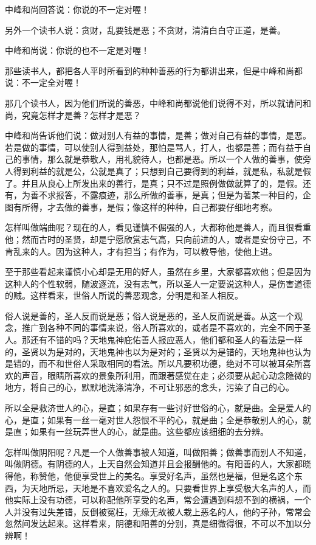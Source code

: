 \documentclass[12pt,twoside,openany]{book}
\begin{document}
中峰和尚回答说：你说的不一定对喔！

另外一个读书人说：贪财，乱要钱是恶；不贪财，清清白白守正道，是善。

中峰和尚说：你说的也不一定是对喔！

那些读书人，都把各人平时所看到的种种善恶的行为都讲出来，但是中峰和尚都说：不一定全对喔！

那几个读书人，因为他们所说的善恶，中峰和尚都说他们说得不对，所以就请问和尚，究竟怎样才是善？怎样才是恶？

中峰和尚告诉他们说：做对别人有益的事情，是善；做对自己有益的事情，是恶。若是做的事情，可以使别人得到益处，那怕是骂人，打人，也都是善；而有益于自己的事情，那么就是恭敬人，用礼貌待人，也都是恶。所以一个人做的善事，使旁人得到利益的就是公，公就是真了；只想到自己要得到的利益，就是私，私就是假了。并且从良心上所发出来的善行，是真；只不过是照例做做就算了的，是假。还有，为善不求报答，不露痕迹，那么所做的善事，是真；但是为著某一种目的，企图有所得，才去做的善事，是假；像这样的种种，自己都要仔细地考察。

怎样叫做端曲呢？现在的人，看见谨慎不倔强的人，大都称他是善人，而且很看重他；然而古时的圣贤，却是宁愿欣赏志气高，只向前进的人，或者是安份守己，不肯乱来的人。因为这种人，才有担当；有作为，可以教导他，使他上进。

至于那些看起来谨慎小心却是无用的好人，虽然在乡里，大家都喜欢他；但是因为这种人的个性软弱，随波逐流，没有志气，所以圣人一定要说这种人，是伤害道德的贼。这样看来，世俗人所说的善恶观念，分明是和圣人相反。

俗人说是善的，圣人反而说是恶；俗人说是恶的，圣人反而说是善。从这一个观念，推广到各种不同的事情来说，俗人所喜欢的，或者是不喜欢的，完全不同于圣人。那还有不错的吗？天地鬼神庇佑善人报应恶人，他们都和圣人的看法是一样的，圣贤以为是对的，天地鬼神也以为是对的；圣贤以为是错的，天地鬼神也认为是错的，而不和世俗人采取相同的看法。所以凡要积功德，绝对不可以被耳朵所喜欢的声音，眼睛所喜欢的景象所利用，而跟著感觉在走；必须要从起心动念隐微的地方，将自己的心，默默地洗涤清净，不可让邪恶的念头，污染了自己的心。

所以全是救济世人的心，是直；如果存有一些讨好世俗的心，就是曲。全是爱人的心，是直；如果有一丝一毫对世人怨恨不平的心，就是曲；全是恭敬别人的心，就是直；如果有一丝玩弄世人的心，就是曲。这些都应该细细的去分辨。

怎样叫做阴阳呢？凡是一个人做善事被人知道，叫做阳善；做善事而别人不知道，叫做阴德。有阴德的人，上天自然会知道并且会报酬他的。有阳善的人，大家都晓得他，称赞他，他便享受世上的美名。享受好名声，虽然也是福，但是名这个东西，为天地所忌，天地是不喜欢爱名之人的。只要看世界上享受极大名声的人，而他实际上没有功德，可以称配他所享受的名声，常会遭遇到料想不到的横祸，一个人并没有过失差错，反倒被冤枉，无缘无故被人栽上恶名的人，他的子孙，常常会忽然间发达起来。这样看来，阴德和阳善的分别，真是细微得很，不可以不加以分辨啊！
\end{document}
